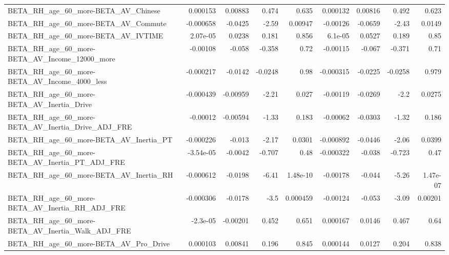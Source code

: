 \begin{tabular}{lrrrrrrrr}
BETA\_RH\_age\_60\_more-BETA\_AV\_Chinese                &    0.000153 &      0.00883 &    0.474 &    0.635 &   0.000132 &     0.00816 &        0.492 &         0.623 \\
BETA\_RH\_age\_60\_more-BETA\_AV\_Commute                &   -0.000658 &      -0.0425 &    -2.59 &  0.00947 &   -0.00126 &     -0.0659 &        -2.43 &        0.0149 \\
BETA\_RH\_age\_60\_more-BETA\_AV\_IVTIME                 &    2.07e-05 &       0.0238 &    0.181 &    0.856 &    6.1e-05 &      0.0527 &        0.189 &          0.85 \\
BETA\_RH\_age\_60\_more-BETA\_AV\_Income\_12000\_more      &    -0.00108 &       -0.058 &   -0.358 &     0.72 &   -0.00115 &      -0.067 &       -0.371 &          0.71 \\
BETA\_RH\_age\_60\_more-BETA\_AV\_Income\_4000\_less       &   -0.000217 &      -0.0142 &  -0.0248 &     0.98 &  -0.000315 &     -0.0225 &      -0.0258 &         0.979 \\
BETA\_RH\_age\_60\_more-BETA\_AV\_Inertia\_Drive          &   -0.000439 &     -0.00959 &    -2.21 &    0.027 &   -0.00119 &     -0.0269 &         -2.2 &        0.0275 \\
BETA\_RH\_age\_60\_more-BETA\_AV\_Inertia\_Drive\_ADJ\_FRE  &    -0.00012 &     -0.00594 &    -1.33 &    0.183 &   -0.00062 &     -0.0303 &        -1.32 &         0.186 \\
BETA\_RH\_age\_60\_more-BETA\_AV\_Inertia\_PT             &   -0.000226 &       -0.013 &    -2.17 &   0.0301 &  -0.000892 &     -0.0446 &        -2.06 &        0.0399 \\
BETA\_RH\_age\_60\_more-BETA\_AV\_Inertia\_PT\_ADJ\_FRE     &   -3.54e-05 &      -0.0042 &   -0.707 &     0.48 &  -0.000322 &      -0.038 &       -0.723 &          0.47 \\
BETA\_RH\_age\_60\_more-BETA\_AV\_Inertia\_RH             &   -0.000612 &      -0.0198 &    -6.41 & 1.48e-10 &   -0.00178 &      -0.044 &        -5.26 &      1.47e-07 \\
BETA\_RH\_age\_60\_more-BETA\_AV\_Inertia\_RH\_ADJ\_FRE     &   -0.000306 &      -0.0178 &     -3.5 & 0.000459 &   -0.00124 &      -0.053 &        -3.09 &       0.00201 \\
BETA\_RH\_age\_60\_more-BETA\_AV\_Inertia\_Walk\_ADJ\_FRE   &    -2.3e-05 &     -0.00201 &    0.452 &    0.651 &   0.000167 &      0.0146 &        0.467 &          0.64 \\
BETA\_RH\_age\_60\_more-BETA\_AV\_Pro\_Drive              &    0.000103 &      0.00841 &    0.196 &    0.845 &   0.000144 &      0.0127 &        0.204 &         0.838 \\

\end{tabular}
